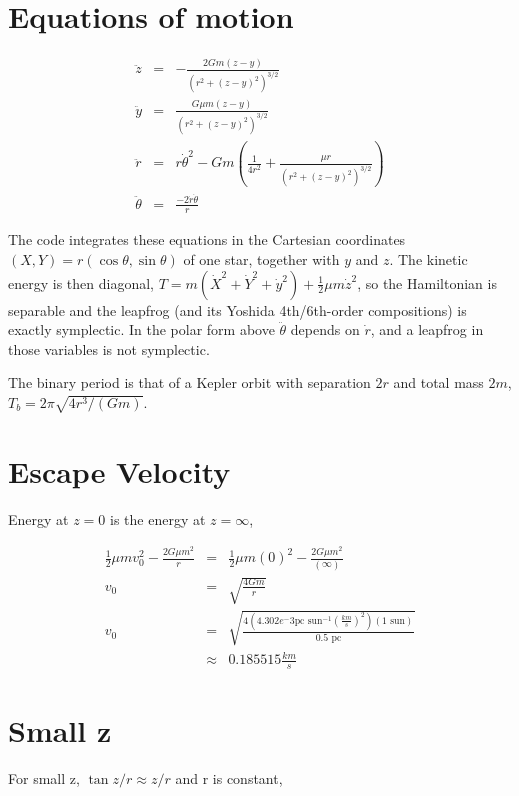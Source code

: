 \documentclass{article}
\begin{document}
\section{Equations of motion}

\begin{eqnarray}
\ddot{z} & = & -\frac{2G m (z-y)}{(r^2 + (z-y)^2)^{3/2}} \\
\ddot{y} & = & \frac{G \mu m (z-y)}{(r^2 + (z-y)^2)^{3/2}} \\
\ddot{r} & = & r\dot{\theta}^2 - Gm (\frac{1}{4r^2} + \frac{\mu r}{(r^2 + (z-y)^2)^{3/2}}) \\
\ddot{\theta} & = & \frac{-2 \dot{r} \dot{\theta}}{r} 
\label{eq:mot}
\end{eqnarray}

The code integrates these equations in the Cartesian coordinates $(X, Y) = r(\cos\theta, \sin\theta)$
of one star, together with $y$ and $z$. The kinetic energy is then diagonal,
$T = m(\dot X^2 + \dot Y^2 + \dot y^2) + \tfrac12\mu m \dot z^2$, so the Hamiltonian is separable and
the leapfrog (and its Yoshida 4th/6th-order compositions) is exactly symplectic. In the polar form above
$\ddot\theta$ depends on $\dot r$, and a leapfrog in those variables is not symplectic.

The binary period is that of a Kepler orbit with separation $2r$ and total mass $2m$,
$T_b = 2\pi\sqrt{4 r^3/(G m)}$.

\section{Escape Velocity}

Energy at $z=0$ is the energy at $z=\infty$,

\begin{eqnarray}
\frac{1}{2}\mu m v_0^2 - \frac{2G \mu m^2}{r} & = & \frac{1}{2}\mu m (0)^2 - \frac{2G \mu m^2}{(\infty)} \\
v_0 & = & \sqrt{\frac{4Gm}{r}} \\
v_0 & = & \sqrt{\frac{4(4.302e^-3 \text{pc sun}^{-1} (\frac{km}{s})^2) (1 \text{ sun})}{0.5 \text{ pc}}} \\
& \approx & 0.185515 \frac{km}{s}
\label{eq:esc}
\end{eqnarray}

\section{Small z}

For small z, $\tan{z/r} \approx z/r$ and r is constant,
\end{document}
